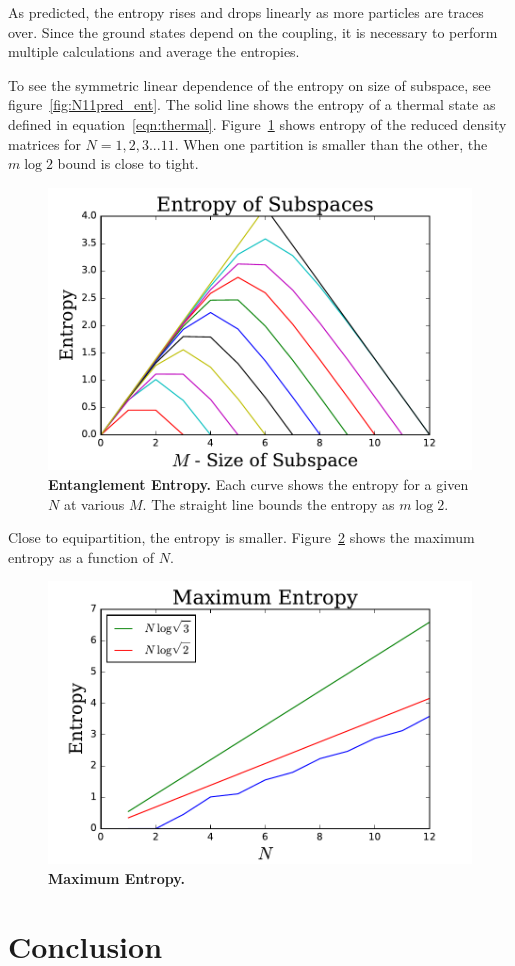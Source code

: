 \documentclass[12pt]{article} %
\begin{document}
As predicted, the entropy rises and drops linearly as more particles are traces over. Since the ground states depend on the coupling, it is necessary to perform multiple calculations and average the entropies. 

To see the symmetric linear dependence of the entropy on size of subspace, see figure~\ref{fig:N11pred_ent}. The solid line shows the entropy of a thermal state as defined in equation~\ref{eqn:thermal}. Figure~\ref{fig:allentropy} shows entropy of the reduced density matrices for $N = 1,2,3...11$. When one partition is smaller than the other, the $m\log2$ bound is close to tight. 

\begin{figure}
	\centering
	\includegraphics[width=.5\textwidth]{allentropy}
	\caption{\textbf{Entanglement Entropy.} Each curve shows the entropy for a given $N$ at various $M$. The straight line bounds the entropy as $m\log2$.}
	\label{fig:allentropy}
\end{figure}

Close to equipartition, the entropy is smaller. Figure~\ref{fig:maxentropy} shows the maximum entropy as a function of $N$.

\begin{figure}
	\centering
	\includegraphics[width=.5\textwidth]{maxentropy}
	\caption{\textbf{Maximum Entropy.} }
	\label{fig:maxentropy}
\end{figure}

\section{Conclusion} \label{sec:concl}
\end{document}
